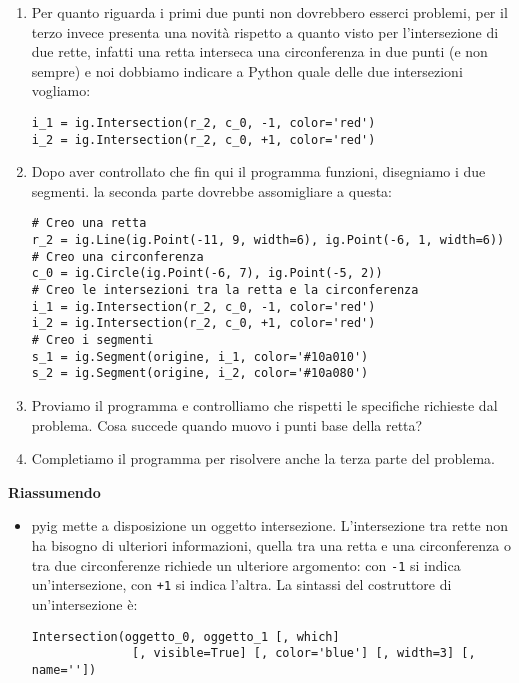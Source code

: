 \begin{enumerate} [noitemsep]
\begin{lstlisting}
# Creo una retta
# Creo una circonferenza
# Creo le intersezioni tra la retta e la circonferenza
# Creo i segmenti
\end{lstlisting}

\item Per quanto riguarda i primi due punti non dovrebbero esserci problemi,
per il terzo invece presenta una novità rispetto a quanto visto per
l'intersezione di due rette, infatti una retta interseca una circonferenza
in due punti (e non sempre) e noi dobbiamo indicare a Python quale delle
due intersezioni vogliamo:

\begin{lstlisting}
i_1 = ig.Intersection(r_2, c_0, -1, color='red')
i_2 = ig.Intersection(r_2, c_0, +1, color='red')
\end{lstlisting}

\item Dopo aver controllato che fin qui il programma funzioni, disegniamo i due
segmenti. la seconda parte dovrebbe assomigliare a questa:

\begin{lstlisting}
# Creo una retta
r_2 = ig.Line(ig.Point(-11, 9, width=6), ig.Point(-6, 1, width=6))
# Creo una circonferenza
c_0 = ig.Circle(ig.Point(-6, 7), ig.Point(-5, 2))
# Creo le intersezioni tra la retta e la circonferenza
i_1 = ig.Intersection(r_2, c_0, -1, color='red')
i_2 = ig.Intersection(r_2, c_0, +1, color='red')
# Creo i segmenti
s_1 = ig.Segment(origine, i_1, color='#10a010')
s_2 = ig.Segment(origine, i_2, color='#10a080')
\end{lstlisting}

\item Proviamo il programma e controlliamo che rispetti le specifiche richieste
dal problema. Cosa succede quando muovo i punti base della retta?

\item Completiamo il programma per risolvere anche la terza parte del problema.

\end{enumerate}

\textbf{Riassumendo}
\begin{itemize} [noitemsep]
\item pyig mette a disposizione un oggetto intersezione. L'intersezione tra 
rette non ha bisogno di ulteriori informazioni, quella tra una retta e una
circonferenza o tra due circonferenze richiede un ulteriore argomento:
con \texttt{-1} si indica un'intersezione, con \texttt{+1} si indica l'altra.
La sintassi del costruttore di un'intersezione è:

\begin{lstlisting}
Intersection(oggetto_0, oggetto_1 [, which] 
              [, visible=True] [, color='blue'] [, width=3] [, name=''])
\end{lstlisting}

\end{itemize}

